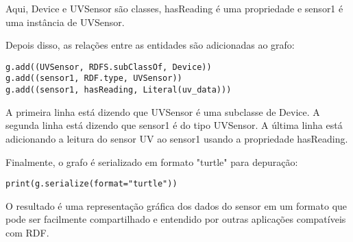 Aqui, Device e UVSensor são classes, hasReading é uma propriedade e sensor1 é uma instância de UVSensor.

Depois disso, as relações entre as entidades são adicionadas ao grafo:
\begin{verbatim}
g.add((UVSensor, RDFS.subClassOf, Device))
g.add((sensor1, RDF.type, UVSensor))
g.add((sensor1, hasReading, Literal(uv_data)))
\end{verbatim}
A primeira linha está dizendo que UVSensor é uma subclasse de Device. A segunda linha está dizendo que sensor1 é do tipo UVSensor. A última linha está adicionando a leitura do sensor UV ao sensor1 usando a propriedade hasReading.

Finalmente, o grafo é serializado em formato "turtle" para depuração:
\begin{verbatim}
print(g.serialize(format="turtle"))
\end{verbatim}

O resultado é uma representação gráfica dos dados do sensor em um formato que pode ser facilmente compartilhado e entendido por outras aplicações compatíveis com RDF.
